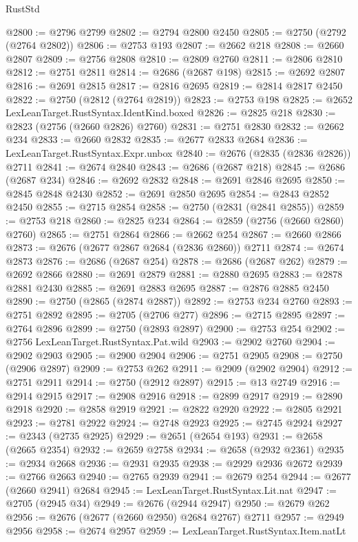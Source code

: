 \begin{lexlean}{RustStd}
\begin{coremodule}
@2800 := @2796 @2799
@2802 := @2794 @2800 @2450
@2805 := @2750 (@2792 (@2764 @2802))
@2806 := @2753 @193
@2807 := @2662 @218
@2808 := @2660 @2807
@2809 := @2756 @2808
@2810 := @2809 @2760
@2811 := @2806 @2810
@2812 := @2751 @2811
@2814 := @2686 (@2687 @198)
@2815 := @2692 @2807
@2816 := @2691 @2815
@2817 := @2816 @2695
@2819 := @2814 @2817 @2450
@2822 := @2750 (@2812 (@2764 @2819))
@2823 := @2753 @198
@2825 := @2652 LexLeanTarget.RustSyntax.IdentKind.boxed
@2826 := @2825 @218
@2830 := @2823 (@2756 (@2660 @2826) @2760)
@2831 := @2751 @2830
@2832 := @2662 @234
@2833 := @2660 @2832
@2835 := @2677 @2833 @2684
@2836 := LexLeanTarget.RustSyntax.Expr.unbox
@2840 := @2676 (@2835 (@2836 @2826)) @2711
@2841 := @2674 @2840
@2843 := @2686 (@2687 @218)
@2845 := @2686 (@2687 @234)
@2846 := @2692 @2832
@2848 := @2691 @2846 @2695
@2850 := @2845 @2848 @2430
@2852 := @2691 @2850 @2695
@2854 := @2843 @2852 @2450
@2855 := @2715 @2854
@2858 := @2750 (@2831 (@2841 @2855))
@2859 := @2753 @218
@2860 := @2825 @234
@2864 := @2859 (@2756 (@2660 @2860) @2760)
@2865 := @2751 @2864
@2866 := @2662 @254
@2867 := @2660 @2866
@2873 := @2676 (@2677 @2867 @2684 (@2836 @2860)) @2711
@2874 := @2674 @2873
@2876 := @2686 (@2687 @254)
@2878 := @2686 (@2687 @262)
@2879 := @2692 @2866
@2880 := @2691 @2879
@2881 := @2880 @2695
@2883 := @2878 @2881 @2430
@2885 := @2691 @2883 @2695
@2887 := @2876 @2885 @2450
@2890 := @2750 (@2865 (@2874 @2887))
@2892 := @2753 @234 @2760
@2893 := @2751 @2892
@2895 := @2705 (@2706 @277)
@2896 := @2715 @2895
@2897 := @2764 @2896
@2899 := @2750 (@2893 @2897)
@2900 := @2753 @254
@2902 := @2756 LexLeanTarget.RustSyntax.Pat.wild
@2903 := @2902 @2760
@2904 := @2902 @2903
@2905 := @2900 @2904
@2906 := @2751 @2905
@2908 := @2750 (@2906 @2897)
@2909 := @2753 @262
@2911 := @2909 (@2902 @2904)
@2912 := @2751 @2911
@2914 := @2750 (@2912 @2897)
@2915 := @13 @2749
@2916 := @2914 @2915
@2917 := @2908 @2916
@2918 := @2899 @2917
@2919 := @2890 @2918
@2920 := @2858 @2919
@2921 := @2822 @2920
@2922 := @2805 @2921
@2923 := @2781 @2922
@2924 := @2748 @2923
@2925 := @2745 @2924
@2927 := @2343 (@2735 @2925)
@2929 := @2651 (@2654 @193)
@2931 := @2658 (@2665 @2354)
@2932 := @2659 @2758
@2934 := @2658 (@2932 @2361)
@2935 := @2934 @2668
@2936 := @2931 @2935
@2938 := @2929 @2936 @2672
@2939 := @2766 @2663
@2940 := @2765 @2939
@2941 := @2679 @254
@2944 := @2677 (@2660 @2941) @2684
@2945 := LexLeanTarget.RustSyntax.Lit.nat
@2947 := @2705 (@2945 @34)
@2949 := @2676 (@2944 @2947)
@2950 := @2679 @262
@2956 := @2676 (@2677 (@2660 @2950) @2684 @2767) @2711
@2957 := @2949 @2956
@2958 := @2674 @2957
@2959 := LexLeanTarget.RustSyntax.Item.natLt

\end{coremodule}
\end{lexlean}
